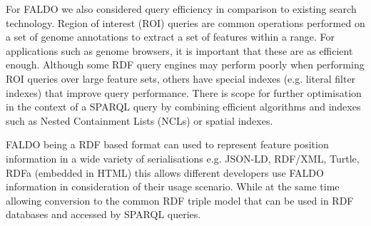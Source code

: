 For FALDO we also considered query efficiency in comparison to existing search technology. 
Region of interest (ROI) queries are common operations performed on a
set of genome annotations to extract a set of features within a range.
For applications such as genome browsers, it is important that these are as efficient enough.
Although some RDF query engines may perform poorly when performing ROI queries over large feature sets,
others have special indexes (e.g. literal filter indexes) that improve query performance.
There is scope for further optimisation in the context of a SPARQL query by combining
efficient algorithms and indexes such as Nested Containment Lists (NCLs) \cite{NCL2007}
or spatial indexes.



FALDO being a RDF based format can used to represent feature position information in a wide variety of serialisations e.g. JSON-LD, RDF/XML, Turtle, RDFa (embedded in HTML) this allows different developers use FALDO information in consideration of their usage scenario.
While at the same time allowing conversion to the common RDF triple model that can be used in RDF databases and accessed by SPARQL queries.


